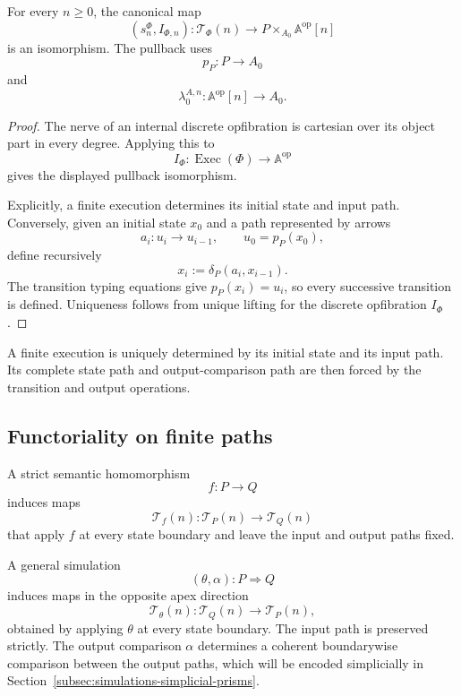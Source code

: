 \begin{proposition}
\label{prop:deterministic-path-lifting}
For every \(n\geq0\), the canonical map
\[
    \left(
        s_n^\Phi,
        I_{\Phi,n}
    \right):
    \mathscr T_\Phi(n)
    \longrightarrow
    P\times_{A_0}\mathbb A^{\mathrm{op}}[n]
\]
is an isomorphism. The pullback uses
\[
    p_P:P\to A_0
\]
and
\[
    \lambda_0^{A,n}:
    \mathbb A^{\mathrm{op}}[n]\to A_0.
\]
\end{proposition}

\begin{proof}
The nerve of an internal discrete opfibration is cartesian over its object
part in every degree. Applying this to
\[
    I_\Phi:\operatorname{Exec}(\Phi)\to\mathbb A^{\mathrm{op}}
\]
gives the displayed pullback isomorphism.

Explicitly, a finite execution determines its initial state and input path.
Conversely, given an initial state \(x_0\) and a path represented by arrows
\[
    a_i:u_i\to u_{i-1},
    \qquad
    u_0=p_P(x_0),
\]
define recursively
\[
    x_i:=\delta_P(a_i,x_{i-1}).
\]
The transition typing equations give \(p_P(x_i)=u_i\), so every successive
transition is defined. Uniqueness follows from unique lifting for the
discrete opfibration \(I_\Phi\).
\end{proof}

\begin{corollary}
\label{cor:finite-execution-determinism}
A finite execution is uniquely determined by its initial state and its input
path. Its complete state path and output-comparison path are then forced by
the transition and output operations.
\end{corollary}

\subsection{Functoriality on finite paths}
\label{subsec:finite-path-functoriality}

A strict semantic homomorphism
\[
    f:P\to Q
\]
induces maps
\[
    \mathscr T_f(n):
    \mathscr T_P(n)
    \longrightarrow
    \mathscr T_Q(n)
\]
that apply \(f\) at every state boundary and leave the input and output paths
fixed.

A general simulation
\[
    (\theta,\alpha):P\Longrightarrow Q
\]
induces maps in the opposite apex direction
\[
    \mathscr T_\theta(n):
    \mathscr T_Q(n)
    \longrightarrow
    \mathscr T_P(n),
\]
obtained by applying \(\theta\) at every state boundary. The input path is
preserved strictly. The output comparison \(\alpha\) determines a coherent
boundarywise comparison between the output paths, which will be encoded
simplicially in
Section~\ref{subsec:simulations-simplicial-prisms}.


